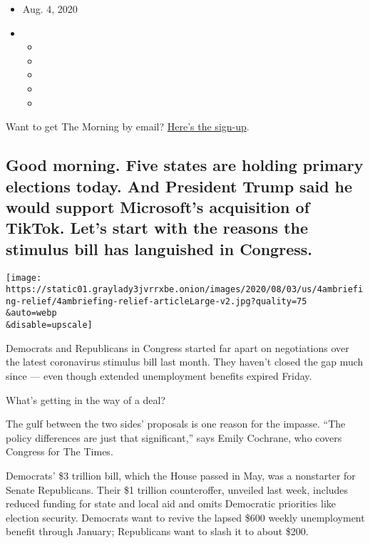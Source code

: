 \begin{itemize}
\item
  Aug. 4, 2020
\item
  \begin{itemize}
  \item
  \item
  \item
  \item
  \item
  \end{itemize}
\end{itemize}

Want to get The Morning by email?
\href{https://www.nytimes3xbfgragh.onion/newsletters/morning-briefing}{Here's
the sign-up}.

\hypertarget{good-morning-five-states-are-holding-primary-elections-today-and-president-trump-said-he-would-support-microsofts-acquisition-of-tiktok-lets-start-with-the-reasons-the-stimulus-bill-has-languished-in-congress}{%
\subsection{Good morning. Five states are holding primary elections
today. And President Trump said he would support Microsoft's acquisition
of TikTok. Let's start with the reasons the stimulus bill has languished
in
Congress.}\label{good-morning-five-states-are-holding-primary-elections-today-and-president-trump-said-he-would-support-microsofts-acquisition-of-tiktok-lets-start-with-the-reasons-the-stimulus-bill-has-languished-in-congress}}

\texttt{[image: https://static01.graylady3jvrrxbe.onion/images/2020/08/03/us/4ambriefing-relief/4ambriefing-relief-articleLarge-v2.jpg?quality=75\\\&auto=webp\\\&disable=upscale]}

Democrats and Republicans in Congress started far apart on negotiations
over the latest coronavirus stimulus bill last month. They haven't
closed the gap much since --- even though extended unemployment benefits
expired Friday.

What's getting in the way of a deal?

The gulf between the two sides' proposals is one reason for the impasse.
``The policy differences are just that significant,'' says Emily
Cochrane, who covers Congress for The Times.

Democrats' \$3 trillion bill, which the House passed in May, was a
nonstarter for Senate Republicans. Their \$1 trillion counteroffer,
unveiled last week, includes reduced funding for state and local aid and
omits Democratic priorities like election security. Democrats want to
revive the lapsed \$600 weekly unemployment benefit through January;
Republicans want to slash it to about \$200.


